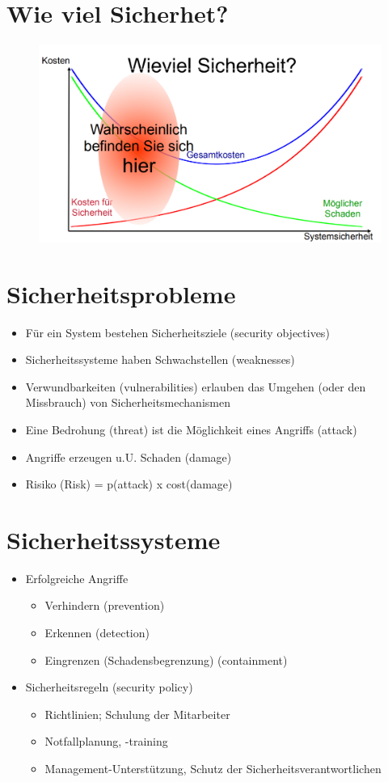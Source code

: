 \documentclass[openany]{book}
\begin{document}
\section{Wie viel Sicherhet?}

\begin{figure}[h!]
\centering
\includegraphics[width=0.7\linewidth]{Pics/HowMuchSecurity.PNG}
\end{figure}

\section{Sicherheitsprobleme}

\begin{itemize}
\item Für ein System bestehen Sicherheitsziele (security objectives)
\item Sicherheitssysteme haben Schwachstellen (weaknesses)
\item Verwundbarkeiten (vulnerabilities) erlauben das Umgehen (oder den Missbrauch) von Sicherheitsmechanismen
\item Eine Bedrohung (threat) ist die Möglichkeit eines Angriffs (attack)
\item Angriffe erzeugen u.U. Schaden (damage)
\item Risiko (Risk) = p(attack) x cost(damage)
\end{itemize}

\section{Sicherheitssysteme}

\begin{itemize}
\item Erfolgreiche Angriffe 
\begin{itemize}
\item Verhindern (prevention)
\item Erkennen (detection)
\item Eingrenzen (Schadensbegrenzung) (containment)
\end{itemize}
\item Sicherheitsregeln (security policy)
\begin{itemize}
\item Richtlinien; Schulung der Mitarbeiter
\item Notfallplanung, -training
\item Management-Unterstützung, Schutz der Sicherheitsverantwortlichen
\end{itemize}
\end{itemize}
\end{document}
